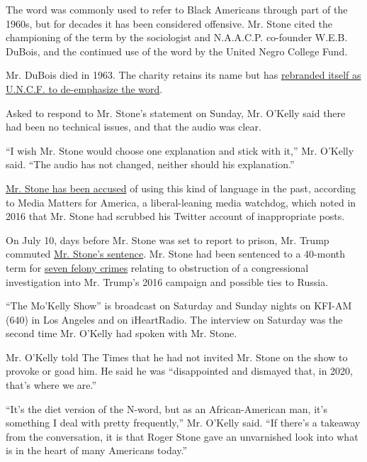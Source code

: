 The word was commonly used to refer to Black Americans through part of
the 1960s, but for decades it has been considered offensive. Mr. Stone
cited the championing of the term by the sociologist and N.A.A.C.P.
co-founder W.E.B. DuBois, and the continued use of the word by the
United Negro College Fund.

Mr. DuBois died in 1963. The charity retains its name but has
\href{https://www.nytimes.com/2008/01/17/business/media/17adco.html}{rebranded
itself as U.N.C.F. to de-emphasize the word}.

Asked to respond to Mr. Stone's statement on Sunday, Mr. O'Kelly said
there had been no technical issues, and that the audio was clear.

``I wish Mr. Stone would choose one explanation and stick with it,'' Mr.
O'Kelly said. ``The audio has not changed, neither should his
explanation.''

\href{https://www.mediamatters.org/donald-trump/trump-ally-roger-stones-scrubbed-tweets-stupid-negro-fat-negro-muff-diver-elitist-cnt}{Mr.
Stone has been accused} of using this kind of language in the past,
according to Media Matters for America, a liberal-leaning media
watchdog, which noted in 2016 that Mr. Stone had scrubbed his Twitter
account of inappropriate posts.

On July 10, days before Mr. Stone was set to report to prison, Mr. Trump
commuted
\href{https://www.nytimes.com/2020/07/10/us/politics/trump-roger-stone-clemency.html}{Mr.
Stone's sentence}. Mr. Stone had been sentenced to a 40-month term for
\href{https://www.nytimes.com/2019/11/15/us/politics/roger-stone-trial-guilty.html}{seven
felony crimes} relating to obstruction of a congressional investigation
into Mr. Trump's 2016 campaign and possible ties to Russia.

``The Mo'Kelly Show'' is broadcast on Saturday and Sunday nights on
KFI-AM (640) in Los Angeles and on iHeartRadio. The interview on
Saturday was the second time Mr. O'Kelly had spoken with Mr. Stone.

Mr. O'Kelly told The Times that he had not invited Mr. Stone on the show
to provoke or goad him. He said he was ``disappointed and dismayed that,
in 2020, that's where we are.''

``It's the diet version of the N-word, but as an African-American man,
it's something I deal with pretty frequently,'' Mr. O'Kelly said. ``If
there's a takeaway from the conversation, it is that Roger Stone gave an
unvarnished look into what is in the heart of many Americans today.''

